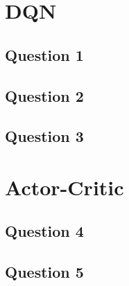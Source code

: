 



\lhead{}

\section{DQN}
  \subsection{Question 1}
  
  \subsection{Question 2}
  
  \subsection{Question 3}
  
\section{Actor-Critic}
  \subsection{Question 4}
  
  \subsection{Question 5}
  





